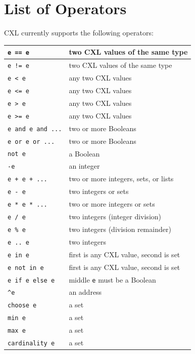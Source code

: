 \documentclass{report}
\begin{document}
\chapter{List of Operators}

CXL currently supports the following operators:

\vspace{1em}
\begin{tabular}{|l|l|}
\hline
\texttt{e == e} & two CXL values of the same type \\
\hline
\texttt{e != e} & two CXL values of the same type \\
\hline
\texttt{e < e} & any two CXL values \\
\hline
\texttt{e <= e} & any two CXL values \\
\hline
\texttt{e > e} & any two CXL values \\
\hline
\texttt{e >= e} & any two CXL values \\
\hline
\texttt{e and e and ...} & two or more Booleans \\
\hline
\texttt{e or e or ...} & two or more Booleans \\
\hline
\texttt{not e} & a Boolean \\
\hline
\texttt{-e} & an integer \\
\hline
\texttt{e + e + ...} & two or more integers, sets, or lists \\
\hline
\texttt{e - e} & two integers or sets \\
\hline
\texttt{e * e * ...} & two or more integers or sets \\
\hline
\texttt{e / e} & two integers (integer division) \\
\hline
\texttt{e \% e} & two integers (division remainder) \\
\hline
\texttt{e~..~e} & two integers \\
\hline
\texttt{e in e} & first is any CXL value, second is set \\
\hline
\texttt{e not in e} & first is any CXL value, second is set \\
\hline
\texttt{e if e else e} & middle \texttt{e} must be a Boolean \\
\hline
\texttt{\^{}e} & an address \\
\hline
\texttt{choose e} & a set \\
\hline
\texttt{min e} & a set \\
\hline
\texttt{max e} & a set \\
\hline
\texttt{cardinality e} & a set \\

\end{tabular}
\end{document}
